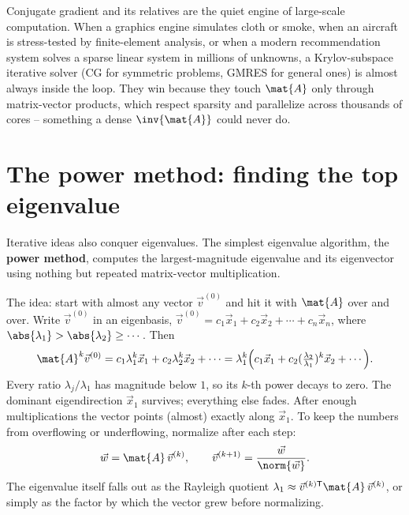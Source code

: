 \begin{applicationbox}
Conjugate gradient and its relatives are the quiet engine of large-scale computation.
When a graphics engine simulates cloth or smoke, when an aircraft is stress-tested by
finite-element analysis, or when a modern recommendation system solves a sparse linear
system in millions of unknowns, a Krylov-subspace iterative solver (CG for symmetric
problems, GMRES for general ones) is almost always inside the loop. They win because
they touch $\mat{A}$ only through matrix-vector products, which respect sparsity and
parallelize across thousands of cores -- something a dense $\inv{\mat{A}}$ could never
do.
\end{applicationbox}

\section{The power method: finding the top eigenvalue}

Iterative ideas also conquer eigenvalues. The simplest eigenvalue algorithm, the
\textbf{power method}, computes the largest-magnitude eigenvalue and its eigenvector
using nothing but repeated matrix-vector multiplication.

The idea: start with almost any vector $\vec{v}^{(0)}$ and hit it with $\mat{A}$ over
and over. Write $\vec{v}^{(0)}$ in an eigenbasis,
$\vec{v}^{(0)} = c_1\vec{x}_1 + c_2\vec{x}_2 + \cdots + c_n\vec{x}_n$, where
$\abs{\lambda_1} > \abs{\lambda_2}\ge\cdots$. Then
\[
  \mat{A}^k\vec{v}^{(0)} = c_1\lambda_1^k\vec{x}_1 + c_2\lambda_2^k\vec{x}_2 + \cdots
   = \lambda_1^k\Bigl(c_1\vec{x}_1 + c_2(\tfrac{\lambda_2}{\lambda_1})^k\vec{x}_2 + \cdots\Bigr).
\]
Every ratio $\lambda_j/\lambda_1$ has magnitude below $1$, so its $k$-th power decays to
zero. The dominant eigendirection $\vec{x}_1$ survives; everything else fades. After
enough multiplications the vector points (almost) exactly along $\vec{x}_1$. To keep the
numbers from overflowing or underflowing, normalize after each step:
\[
  \vec{w} = \mat{A}\,\vec{v}^{(k)}, \qquad
  \vec{v}^{(k+1)} = \frac{\vec{w}}{\norm{\vec{w}}}.
\]
The eigenvalue itself falls out as the Rayleigh quotient
$\lambda_1 \approx \vec{v}^{(k)\mathsf T}\mat{A}\,\vec{v}^{(k)}$, or simply as the
factor by which the vector grew before normalizing.

